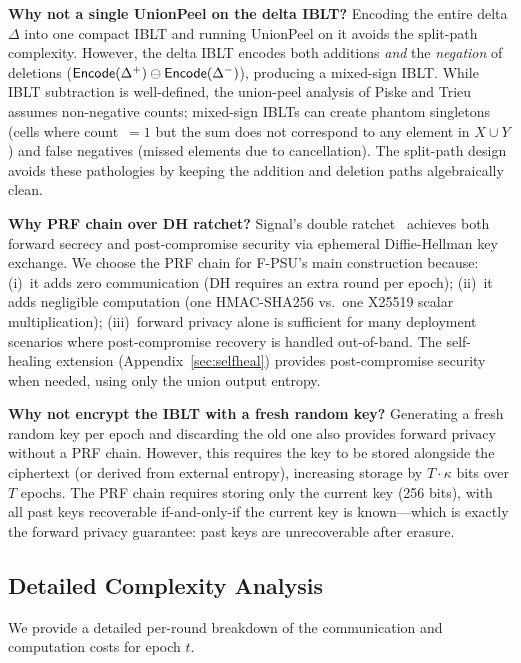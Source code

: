 \documentclass[letterpaper,twocolumn,10pt]{article}
\theoremstyle{definition}
\begin{document}
\smallskip\noindent\textbf{Why not a single UnionPeel on the delta IBLT?}
Encoding the entire delta $\Delta$ into one compact IBLT and running
UnionPeel on it avoids the split-path complexity. However, the delta IBLT
encodes both additions \emph{and} the \emph{negation} of deletions
($\mathsf{Encode}(\Delta^+) \ominus \mathsf{Encode}(\Delta^-)$), producing a mixed-sign
IBLT. While IBLT subtraction is well-defined, the union-peel analysis of
Piske and Trieu~\cite{PT26} assumes non-negative counts; mixed-sign IBLTs
can create phantom singletons (cells where count~$=1$ but the sum does not
correspond to any element in $X \cup Y$) and false negatives (missed elements
due to cancellation). The split-path design avoids these pathologies by
keeping the addition and deletion paths algebraically clean.

\smallskip\noindent\textbf{Why PRF chain over DH ratchet?}
Signal's double ratchet~\cite{Signal} achieves both forward secrecy and
post-compromise security via ephemeral Diffie-Hellman key exchange. We choose
the PRF chain for F-PSU's main construction because: (i)~it adds zero
communication (DH requires an extra round per epoch); (ii)~it adds negligible
computation (one HMAC-SHA256 vs.\ one X25519 scalar multiplication);
(iii)~forward privacy alone is sufficient for many deployment scenarios where
post-compromise recovery is handled out-of-band. The self-healing extension
(Appendix~\ref{sec:selfheal}) provides post-compromise security when needed,
using only the union output entropy.

\smallskip\noindent\textbf{Why not encrypt the IBLT with a fresh random key?}
Generating a fresh random key per epoch and discarding the old one also
provides forward privacy without a PRF chain. However, this requires the key
to be stored alongside the ciphertext (or derived from external entropy),
increasing storage by $T \cdot \kappa$ bits over $T$ epochs. The PRF chain
requires storing only the current key (256 bits), with all past keys
recoverable if-and-only-if the current key is known---which is exactly the
forward privacy guarantee: past keys are unrecoverable after erasure.

\subsection{Detailed Complexity Analysis}

We provide a detailed per-round breakdown of the communication and
computation costs for epoch $t$.
\end{document}

